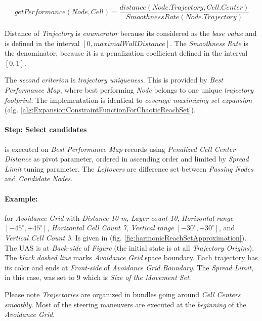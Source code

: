\begin{equation}
    getPerformance(Node,Cell) = \frac{distance(Node.Trajectory,Cell.Center)}{SmoothnessRate(Node.Trajectory)}
\end{equation}

\noindent Distance of \emph{Trajectory} is \emph{enumerator} because its considered as the \emph{base value} and is defined in the interval $[0,maximalWallDistance]$. The \emph{Smoothness Rate} is the denominator, because it is a penalization coefficient defined in the interval $[0,1]$. 

The \emph{second criterion} is \emph{trajectory uniqueness}. This is provided by \emph{Best Performance Map}, where best performing \emph{Node} belongs to one unique \emph{trajectory footprint}. The implementation is identical to \emph{coverage-maximizing set expansion} (alg. \ref{alg:ExpansionConstraintFunctionForChaoticReachSet}).

\paragraph{Step: Select candidates} is executed  on \emph{Best Performance Map} records using \emph{Penalized Cell Center Distance} as pivot parameter, ordered in ascending order and limited by \emph{Spread Limit} tuning parameter. The \emph{Leftovers} are difference set between \emph{Passing Nodes} and \emph{Candidate Nodes}.




\paragraph{Example:} for \emph{Avoidance Grid} with \emph{Distance 10 m}, \emph{Layer count 10}, \emph{Horizontal range $[-45^\circ,+45^\circ]$}, \emph{Horizontal Cell Count 7}, \emph{Vertical range $[-30^\circ,+30^\circ]$}, and \emph{Vertical Cell Count 5}. Is given in (fig. \ref{fig:harmonicReachSetApproximation}). The UAS is at \emph{Back-side} of \emph{Figure} (the initial state is at all \emph{Trajectory Origins}). The \emph{black dashed line} marks \emph{Avoidance Grid} space boundary. Each trajectory has its color and ends at \emph{Front-side} of \emph{Avoidance Grid Boundary}. The \emph{Spread Limit}, in this case, was set to $9$ which is \emph{Size of the Movement Set}.

\begin{note}
    Please note \emph{Trajectories} are organized in bundles going around \emph{Cell Centers smoothly}. Most of the steering maneuvers are executed at the \emph{beginning} of the \emph{Avoidance Grid}.
\end{note}

